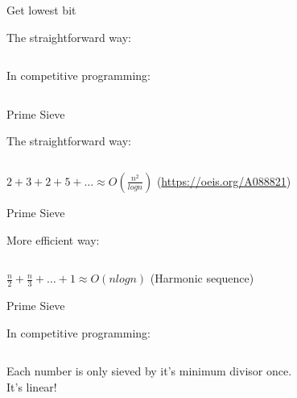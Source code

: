 \begin{frame}{Get lowest bit}
  \begin{minipage}{\textwidth}
   {
    The straightforward way:
    \inputminted[linenos=true, fontsize=\small, bgcolor=mygray, ]{python}{./src/lowb0.py}
  }
  \end{minipage}

  \begin{minipage}{.6\textwidth}
   {
    In competitive programming:
    \inputminted[linenos=true, fontsize=\small, bgcolor=mygray, ]{python}{./src/lowb.py}
  }
  \end{minipage}
\end{frame}

\begin{frame}{Prime Sieve}
 {
  The straightforward way:
  \inputminted[linenos=true, fontsize=\scriptsize, bgcolor=mygray, ]{python}{./src/prime0.py}
}
 {
  \small $2+3+2+5+\ldots \approx O(\frac{n^2}{log n})$ (\url{https://oeis.org/A088821})
}
\end{frame}

\begin{frame}{Prime Sieve}
   {
    \small More efficient way:
    \inputminted[linenos=true, fontsize=\scriptsize, bgcolor=mygray, ]{python}{./src/prime1.py}
  }
   {
    \small $\frac{n}{2} + \frac{n}{3} + \ldots + 1 \approx O(nlogn)$ (Harmonic sequence)
  }
\end{frame}

\begin{frame}{Prime Sieve}
  \begin{minipage}{\textwidth}
   {
    \small In competitive programming:
    \inputminted[linenos=true, fontsize=\scriptsize, bgcolor=mygray, ]{python}{./src/prime2.py}
  }
  \end{minipage}
  \begin{minipage}{\textwidth}
     \small Each number is only sieved by it's minimum divisor once.\\
     \small It's linear!
  \end{minipage}
\end{frame}

